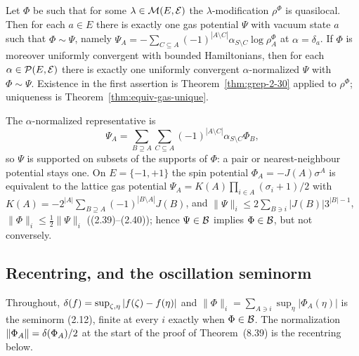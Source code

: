 \begin{theorem}[Georgii (2.35)(b)]
    \label{thm:equiv-gas-representative}

    Let $\Phi$ be such that for some $\lambda \in \mathcal{M}(E,\mathcal{E})$ the $\lambda$-modification
    $\rho^\Phi$ is quasilocal. Then for each $a \in E$ there is exactly one gas potential $\Psi$
    with vacuum state $a$ such that $\Phi \sim \Psi$, namely
    $\Psi_A = -\sum_{C \subseteq A} (-1)^{|A \setminus C|} \alpha_{S \setminus C} \log \rho_A^\Phi$
    at $\alpha = \delta_a$. If $\Phi$ is moreover uniformly convergent with bounded Hamiltonians,
    then for each $\alpha \in \mathcal{P}(E,\mathcal{E})$ there is exactly one uniformly convergent
    $\alpha$-normalized $\Psi$ with $\Phi \sim \Psi$. Existence in the first assertion is
    Theorem~\ref{thm:grep-2-30} applied to $\rho^\Phi$; uniqueness is
    Theorem~\ref{thm:equiv-gas-unique}.
\end{theorem}

\begin{remark}
    \label{rmk:equiv-normalized-formula}

    The $\alpha$-normalized representative is
    \[ \Psi_A = \sum_{B \supseteq A} \sum_{C \subseteq A} (-1)^{|A \setminus C|}
        \alpha_{S \setminus C} \Phi_B , \]
    so $\Psi$ is supported on subsets of the supports of $\Phi$: a pair or nearest-neighbour
    potential stays one. On $E = \{-1,+1\}$ the spin potential $\Phi_A = -J(A) \sigma^A$ is
    equivalent to the lattice gas potential $\Psi_A = K(A) \prod_{i \in A}(\sigma_i+1)/2$ with
    $K(A) = -2^{|A|} \sum_{B \supseteq A} (-1)^{|B \setminus A|} J(B)$, and
    $\|\Psi\|_i \leq 2 \sum_{B \ni i} |J(B)| 3^{|B|-1}$, $\|\Phi\|_i \leq \tfrac12 \|\Psi\|_i$
    ((2.39)--(2.40)); hence $\Psi \in \mathcal{B}$ implies $\Phi \in \mathcal{B}$, but not conversely.
\end{remark}

\subsection*{Recentring, and the oscillation seminorm}

Throughout, $\delta(f) = \sup_{\zeta,\eta} |f(\zeta) - f(\eta)|$ and
$\|\Phi\|_i = \sum_{A \ni i} \sup_\eta |\Phi_A(\eta)|$ is the seminorm (2.12), finite at every
$i$ exactly when $\Phi \in \mathcal{B}$. The normalization $\|\Phi_A\| = \delta(\Phi_A)/2$ at the start
of the proof of Theorem~(8.39) is the recentring below.

